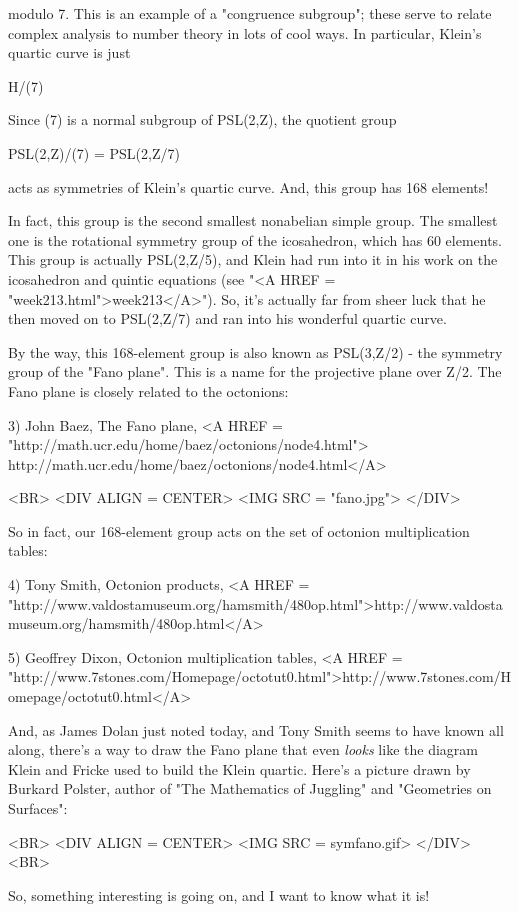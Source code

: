 modulo 7.  This is an example of a "congruence subgroup"; these serve
to relate complex analysis to number theory in lots of cool ways.
In particular, Klein's quartic curve is just

H/\Gamma (7)

Since \Gamma (7) is a normal subgroup of PSL(2,Z), the quotient
group 

PSL(2,Z)/\Gamma (7) = PSL(2,Z/7) 

acts as symmetries of Klein's quartic curve.  And, this group has
168 elements!  

In fact, this group is the second smallest nonabelian simple group.
The smallest one is the rotational symmetry group of the icosahedron,
which has 60 elements.  This group is actually PSL(2,Z/5), and
Klein had run into it in his work on the icosahedron and 
quintic equations (see "<A HREF = "week213.html">week213</A>").  
So, it's actually far from 
sheer luck that he then moved on to PSL(2,Z/7) and ran into his 
wonderful quartic curve.

By the way, this 168-element group is also known as PSL(3,Z/2) - 
the symmetry group of the "Fano plane".  This is a name for the 
projective plane over Z/2.  The Fano plane is closely related to 
the octonions:

3) John Baez, The Fano plane,
<A HREF = "http://math.ucr.edu/home/baez/octonions/node4.html">
http://math.ucr.edu/home/baez/octonions/node4.html</A>

<BR>
<DIV ALIGN = CENTER>
<IMG SRC = "fano.jpg">
</DIV>


So in fact, our 168-element group acts on the set of octonion
multiplication tables:

4) Tony Smith, Octonion products,
<A HREF = "http://www.valdostamuseum.org/hamsmith/480op.html">http://www.valdostamuseum.org/hamsmith/480op.html</A>

5) Geoffrey Dixon, Octonion multiplication tables,
<A HREF = "http://www.7stones.com/Homepage/octotut0.html">http://www.7stones.com/Homepage/octotut0.html</A>

And, as James Dolan just noted today, and Tony Smith seems to have known
all along, there's a way to draw the Fano plane that even \emph{looks} like 
the diagram Klein and Fricke used to build the Klein quartic.  Here's
a picture drawn by Burkard Polster, author of "The Mathematics
of Juggling" and "Geometries on Surfaces":

<BR>
<DIV ALIGN = CENTER>
<IMG SRC = symfano.gif>
</DIV>
<BR>

So, something interesting is going on, and I want to know what it is!


